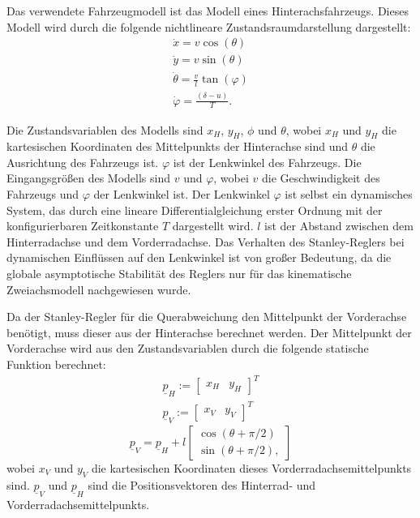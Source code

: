 \documentclass[arbeit=studie,oneside,BCOR=12mm]{ArbeitRST}
\begin{document}
Das verwendete Fahrzeugmodell ist das Modell eines Hinterachsfahrzeugs. Dieses
Modell wird durch die folgende nichtlineare Zustandsraumdarstellung
dargestellt: 
\begin{gather} 
  \dot{x} = v \cos(\theta) \\ 
  \dot{y} = v \sin(\theta) \\ 
  \dot{\theta} = \frac{v}{l}\tan(\varphi) \\
  \dot{\varphi} = \frac{\left(\delta-u\right)}{T}. 
\end{gather}

Die Zustandsvariablen des Modells sind $x_H$, $y_H$, $\phi$ und $\theta$, wobei
$x_H$ und $y_H$ die kartesischen Koordinaten des Mittelpunkts der Hinterachse
sind und $\theta$ die Ausrichtung des Fahrzeugs ist. $\varphi$ ist der
Lenkwinkel des Fahrzeugs. Die Eingangsgrößen des Modells sind $v$ und
$\varphi$, wobei $v$ die Geschwindigkeit des Fahrzeugs und $\varphi$ der
Lenkwinkel ist. Der Lenkwinkel $\varphi$ ist selbst ein dynamisches System, das
durch eine lineare Differentialgleichung erster Ordnung mit der
konfigurierbaren Zeitkonstante $T$ dargestellt wird. $l$ ist der Abstand
zwischen dem Hinterradachse und dem Vorderradachse.  Das Verhalten des
Stanley-Reglers bei dynamischen Einflüssen auf den Lenkwinkel ist von großer
Bedeutung, da die globale asymptotische Stabilität des Reglers nur für das
kinematische Zweiachsmodell nachgewiesen wurde.

Da der Stanley-Regler für die Querabweichung den Mittelpunkt der Vorderachse
benötigt, muss dieser aus der Hinterachse berechnet werden. Der Mittelpunkt der
Vorderachse wird aus den Zustandsvariablen durch die folgende statische
Funktion berechnet: 
\begin{gather}
  \underline{p}_H := 
  \begin{bmatrix}
    x_H & y_H
  \end{bmatrix}^T \\
  \underline{p}_V := 
  \begin{bmatrix}
    x_V & y_V
  \end{bmatrix}^T
  \label{eq:Rear Axle and Front Axle}
\end{gather}
\begin{equation}
  \underline{p}_V = \underline{p}_H + l 
  \begin{bmatrix}
    \cos(\theta + \pi/2) \\ 
    \sin(\theta + \pi/2),
  \end{bmatrix}
  \label{eq:Transformation from Rear Axle to Front Axle}
\end{equation}
wobei $x_V$ und $y_V$ die kartesischen Koordinaten dieses Vorderradachsemittelpunkts sind.
$\underline{p}_V$ und $\underline{p}_H$ sind die Positionsvektoren des
Hinterrad- und Vorderradachsemittelpunkts.
\end{document}
